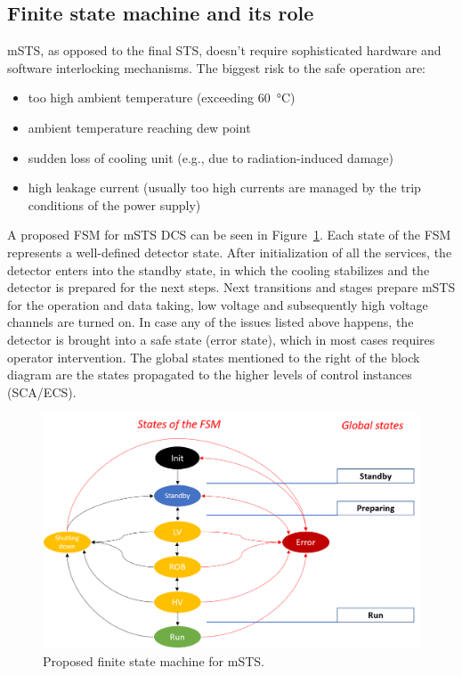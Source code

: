 \subsection{Finite state machine and its role}
\gls{mSTS}, as opposed to the final \gls{STS}, doesn't require sophisticated hardware and software interlocking mechanisms. The biggest risk to the safe operation are:
\begin{itemize}
    \item too high ambient temperature (exceeding \SI{60}{\degreeCelsius})
    \item ambient temperature reaching dew point 
    \item sudden loss of cooling unit (e.g., due to radiation-induced damage)
    \item high leakage current (usually too high currents are managed by the trip conditions of the power supply)
\end{itemize}
A proposed \gls{FSM} for \gls{mSTS} \gls{DCS} can be seen in Figure~\ref{fig_FSM}. Each state of the \gls{FSM} represents a well-defined detector state. After initialization of all the services, the detector enters into the standby state, in which the cooling stabilizes and the detector is prepared for the next steps. Next transitions and stages prepare \gls{mSTS} for the operation and data taking, low voltage and subsequently high voltage channels are turned on. In case any of the issues listed above happens, the detector is brought into a safe state (error state), which in most cases requires operator intervention. The global states mentioned to the right of the block diagram are the states propagated to the higher levels of control instances (\gls{SCA}/\gls{ECS}).
\begin{figure}[h!]
\centering
\includegraphics[width=1\columnwidth]{Chapter6/DCS/images/FSM.png}
\caption{Proposed finite state machine for \gls{mSTS}. }
\label{fig_FSM}
\end{figure}

